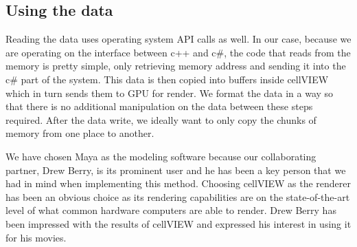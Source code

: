 \documentclass[
  digital, %
  table,   %
  nolof,     %
  nolot,     %
]{fithesis3}
\begin{document}
\subsection{Using the data}
Reading the data uses operating system API calls as well. In our case, because we are operating on the interface between c++ and c\#, the code that reads from the memory is pretty simple, only retrieving memory address and sending it into the c\# part of the system. This data is then copied into buffers inside cellVIEW which in turn sends them to GPU for render. We format the data in a way so that there is no additional manipulation on the data between these steps required. After the data write, we ideally want to only copy the chunks of memory from one place to another.

We have chosen Maya as the modeling software because our collaborating partner, Drew Berry, is its prominent user and he has been a key person that we had in mind when implementing this method. Choosing cellVIEW as the renderer has been an obvious choice as its rendering capabilities are on the state-of-the-art level of what common hardware computers are able to render. Drew Berry has been impressed with the results of cellVIEW and expressed his interest in using it for his movies.

\end{document}
